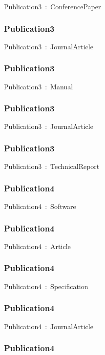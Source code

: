 \documentclass{article}
\begin{document}
Publication3~:~ConferencePaper

\subsubsection*{Publication3}

Publication3~:~JournalArticle

\subsubsection*{Publication3}

Publication3~:~Manual

\subsubsection*{Publication3}

Publication3~:~JournalArticle

\subsubsection*{Publication3}

Publication3~:~TechnicalReport

\subsubsection*{Publication4}

Publication4~:~Software

\subsubsection*{Publication4}

Publication4~:~Article

\subsubsection*{Publication4}

Publication4~:~Specification

\subsubsection*{Publication4}

Publication4~:~JournalArticle

\subsubsection*{Publication4}
\end{document}
